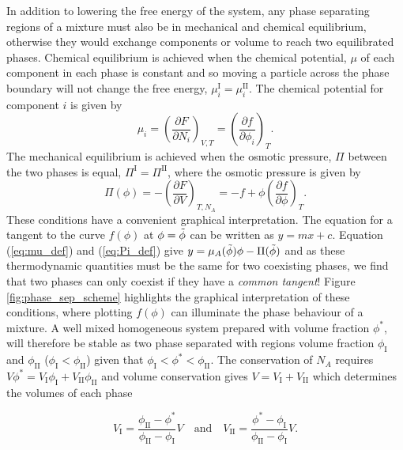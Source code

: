In addition to lowering the free energy of the system, any phase separating regions of a mixture must also be in mechanical and chemical equilibrium, otherwise they would exchange components or volume to reach two equilibrated phases. Chemical equilibrium is achieved when the chemical potential, $\mu$ of each component in each phase is constant and so moving a particle across the phase boundary will not change the free energy, $\mu_i^{\mathrm{I}}=\mu_i^{\mathrm{II}}$. The chemical potential for component $i$ is given by
\begin{equation}
    \mu_i = \left(\frac{\partial F}{\partial N_i}\right)_{V, T} = \left(\frac{\partial f}{\partial \phi_i}\right)_{T}.
    \label{eq:mu_def}
\end{equation}
The mechanical equilibrium is achieved when the osmotic pressure, $\Pi$ between the two phases is equal, $\Pi^{\mathrm{I}}=\Pi^{\mathrm{II}}$, where the osmotic pressure is given by 
\begin{equation}
    \Pi(\phi) = -\left(\frac{\partial F}{\partial V}\right)_{T, N_A} = -f + \phi \left(\frac{\partial f}{\partial \phi}\right)_{T}.
    \label{eq:Pi_def}
\end{equation}
These conditions have a convenient graphical interpretation. The equation for a tangent to the curve $f(\phi)$ at $\phi=\Tilde{\phi}$ can be written as $y=mx+c$. Equation (\ref{eq:mu_def}) and (\ref{eq:Pi_def}) give $y=\mu_A(\Tilde{\phi})\phi - \Pi(\Tilde{\phi})$ and as these thermodynamic quantities must be the same for two coexisting phases, we find that two phases can only coexist if they have a \textit{common tangent}! Figure \ref{fig:phase_sep_scheme} highlights the graphical interpretation of these conditions, where plotting $f(\phi)$ can illuminate the phase behaviour of a mixture. A well mixed homogeneous system prepared with volume fraction $\phi^*$, will therefore be stable as two phase separated with regions volume fraction $\phi_{\mathrm{I}}$ and $\phi_{\mathrm{II}}$ ($\phi_{\mathrm{I}} < \phi_{\mathrm{II}}$) given that $\phi_{\mathrm{I}} < \phi^* < \phi_{\mathrm{II}}$. The conservation of $N_A$ requires $V\phi^* = V_{\mathrm{I}}\phi_{\mathrm{I}} +V_{\mathrm{II}}\phi_{\mathrm{II}}$ and volume conservation gives $V = V_{\mathrm{I}}+V_{\mathrm{II}}$ which determines the volumes of each phase

\begin{equation}
    V_{\mathrm{I}} = \frac{\phi_{\mathrm{II}}-\phi^*}{\phi_{\mathrm{II}}-\phi_{\mathrm{I}}}V
    \quad
    \textrm{and}
    \quad
    V_{\mathrm{II}} = \frac{\phi^*-\phi_{\mathrm{I}}}{\phi_{\mathrm{II}}-\phi_{\mathrm{I}}}V.
\end{equation}

